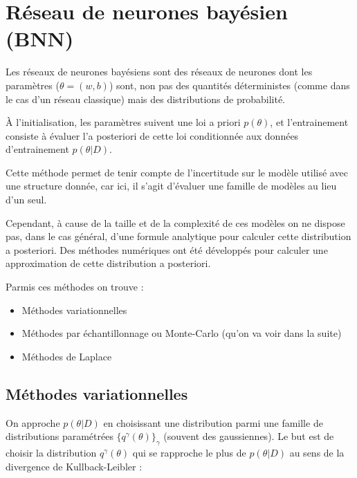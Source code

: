 \documentclass[french,12pt]{article}
\let\oldsection\section%
\renewcommand{\section}{%
  \renewcommand{\theequation}{\thesection.\arabic{equation}}%
  \oldsection}%
\let\oldsubsection\subsection%
\renewcommand{\subsection}{%
  \renewcommand{\theequation}{\thesubsection.\arabic{equation}}%
  \oldsubsection}%
\begin{document}
\pagebreak

\section{Réseau de neurones bayésien (BNN)}


Les réseaux de neurones bayésiens sont des réseaux de neurones
dont les paramètres ($\theta = (w, b)$) sont, non pas des quantités déterministes (comme
dans le cas d'un réseau classique) mais des distributions de probabilité.

À l'initialisation, les paramètres suivent une loi a priori $p(\theta)$,
et l'entrainement consiste à évaluer l'a posteriori de cette loi conditionnée
aux données d'entrainement $p(\theta | D)$.

Cette méthode permet de tenir compte de l'incertitude sur le modèle utilisé
avec une structure donnée, car ici, il s'agit d'évaluer
une famille de modèles au lieu d'un seul.


Cependant, à cause de la taille et de la complexité de ces modèles
on ne dispose pas, dans le cas général, d'une formule analytique pour
calculer cette distribution a posteriori. Des méthodes numériques
ont été développés pour calculer une approximation de cette distribution a posteriori.

Parmis ces méthodes on trouve :
\begin{itemize}
    \item Méthodes variationnelles
    \item Méthodes par échantillonnage ou
          Monte-Carlo (qu'on va voir dans la suite)
    \item Méthodes de Laplace
\end{itemize}


\subsection{Méthodes variationnelles}

On approche $p(\theta | D)$ en choisissant une distribution parmi une famille de distributions
paramétrées $\{q^{\gamma}(\theta)\}_{\gamma}$ (souvent des gaussiennes).
Le but est de choisir la distribution $q^{\gamma}(\theta)$ qui se rapproche 
le plus de $p(\theta | D)$ au sens de la divergence de Kullback-Leibler :
\end{document}
